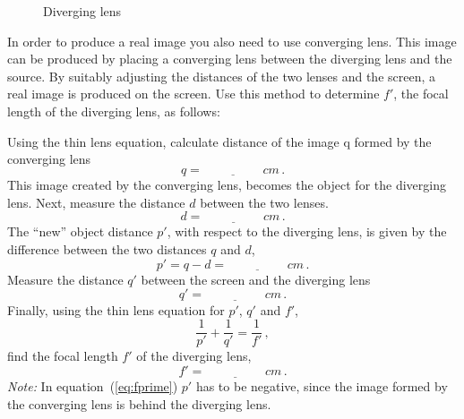 \documentclass[11pt, a4paper]{article}
\begin{document}
\begin{figure}[tbh]
    \centering
    \def\svgwidth{0.7\textwidth}
    
    \caption{Diverging lens}
    \label{fig:divLens}
\end{figure}

In order to produce a real image you also need to use converging lens.
This image can be produced by placing a converging lens between the diverging
lens and the source.
By suitably adjusting the distances of the two lenses and the screen, a real
image is produced on the screen.
Use this method to determine $f'$, the focal length of the diverging lens, as follows:

Using the thin lens equation, calculate distance of the image q formed by the converging lens
\begin{equation*}
    q = \underline{\hspace{2cm}} \si{cm}\,.
\end{equation*}
This image created by the converging lens, becomes the object for the diverging lens. 
Next, measure the distance $d$ between the two lenses.
\begin{equation*}
    d = \underline{\hspace{2cm}} \si{cm}\,.
\end{equation*}
The ``new'' object distance $p'$, with respect to the diverging lens, is given by the
difference between the two distances $q$ and $d$,
\begin{equation*}
    p' = q - d  = \underline{\hspace{2cm}} \si{cm}\,.
\end{equation*}
Measure the distance $q'$ between the screen and the diverging lens
\begin{equation*}
     q'  = \underline{\hspace{2cm}} \si{cm}\,.
\end{equation*}
Finally, using the thin lens equation for $p'$, $q'$ and $f'$,
\begin{equation}
    \frac{1}{p'} + \frac{1}{q'} = \frac{1}{f'}\,,
\end{equation}
find the focal length $f'$ of the diverging lens,
\begin{equation*}
     f'  = \underline{\hspace{2cm}} \si{cm}\,.
     \label{eq:fprime}
\end{equation*}
\textit{Note:} In equation~(\ref{eq:fprime}) $p'$ has to be negative, since the image formed by
the converging lens is behind the diverging lens.
\end{document}

